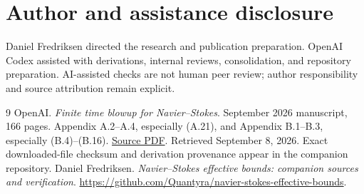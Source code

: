 \documentclass[11pt]{article}
\begin{document}
\section*{Author and assistance disclosure}
Daniel Fredriksen directed the research and publication preparation.
OpenAI Codex assisted with derivations, internal reviews, consolidation,
and repository preparation. AI-assisted checks are not human peer review;
author responsibility and source attribution remain explicit.

\begin{thebibliography}{9}
 OpenAI. \emph{Finite time blowup for Navier--Stokes}.
September 2026 manuscript, 166 pages. Appendix A.2--A.4, especially
(A.21), and Appendix B.1--B.3, especially (B.4)--(B.16).
\href{https://cdn.openai.com/pdf/32d9f210-8b73-45e0-91bc-82a30aef8a9a/navier-stokes.pdf}{Source PDF}.
Retrieved September 8, 2026. Exact downloaded-file checksum and derivation
provenance appear in the companion repository.
 Daniel Fredriksen.
\emph{Navier--Stokes effective bounds: companion sources and verification}.
\url{https://github.com/Quantyra/navier-stokes-effective-bounds}.
\end{thebibliography}
\end{document}
